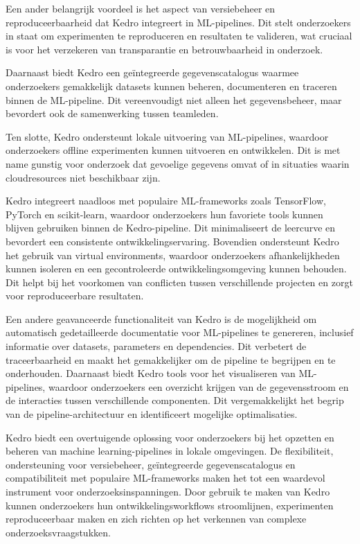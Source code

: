 Een ander belangrijk voordeel is het aspect van versiebeheer en reproduceerbaarheid dat Kedro integreert in ML-pipelines. Dit stelt onderzoekers in staat om experimenten te reproduceren en resultaten te valideren, wat cruciaal is voor het verzekeren van transparantie en betrouwbaarheid in onderzoek.

Daarnaast biedt Kedro een geïntegreerde gegevenscatalogus waarmee onderzoekers gemakkelijk datasets kunnen beheren, documenteren en traceren binnen de ML-pipeline. Dit vereenvoudigt niet alleen het gegevensbeheer, maar bevordert ook de samenwerking tussen teamleden.

Ten slotte, Kedro ondersteunt lokale uitvoering van ML-pipelines, waardoor onderzoekers offline experimenten kunnen uitvoeren en ontwikkelen. Dit is met name gunstig voor onderzoek dat gevoelige gegevens omvat of in situaties waarin cloudresources niet beschikbaar zijn.

Kedro integreert naadloos met populaire ML-frameworks zoals TensorFlow, PyTorch en scikit-learn, waardoor onderzoekers hun favoriete tools kunnen blijven gebruiken binnen de Kedro-pipeline. Dit minimaliseert de leercurve en bevordert een consistente ontwikkelingservaring. Bovendien ondersteunt Kedro het gebruik van virtual environments, waardoor onderzoekers afhankelijkheden kunnen isoleren en een gecontroleerde ontwikkelingsomgeving kunnen behouden. Dit helpt bij het voorkomen van conflicten tussen verschillende projecten en zorgt voor reproduceerbare resultaten.

Een andere geavanceerde functionaliteit van Kedro is de mogelijkheid om automatisch gedetailleerde documentatie voor ML-pipelines te genereren, inclusief informatie over datasets, parameters en dependencies. Dit verbetert de traceerbaarheid en maakt het gemakkelijker om de pipeline te begrijpen en te onderhouden. Daarnaast biedt Kedro tools voor het visualiseren van ML-pipelines, waardoor onderzoekers een overzicht krijgen van de gegevensstroom en de interacties tussen verschillende componenten. Dit vergemakkelijkt het begrip van de pipeline-architectuur en identificeert mogelijke optimalisaties.

Kedro biedt een overtuigende oplossing voor onderzoekers bij het opzetten en beheren van machine learning-pipelines in lokale omgevingen. De flexibiliteit, ondersteuning voor versiebeheer, geïntegreerde gegevenscatalogus en compatibiliteit met populaire ML-frameworks maken het tot een waardevol instrument voor onderzoeksinspanningen. Door gebruik te maken van Kedro kunnen onderzoekers hun ontwikkelingsworkflows stroomlijnen, experimenten reproduceerbaar maken en zich richten op het verkennen van complexe onderzoeksvraagstukken.
